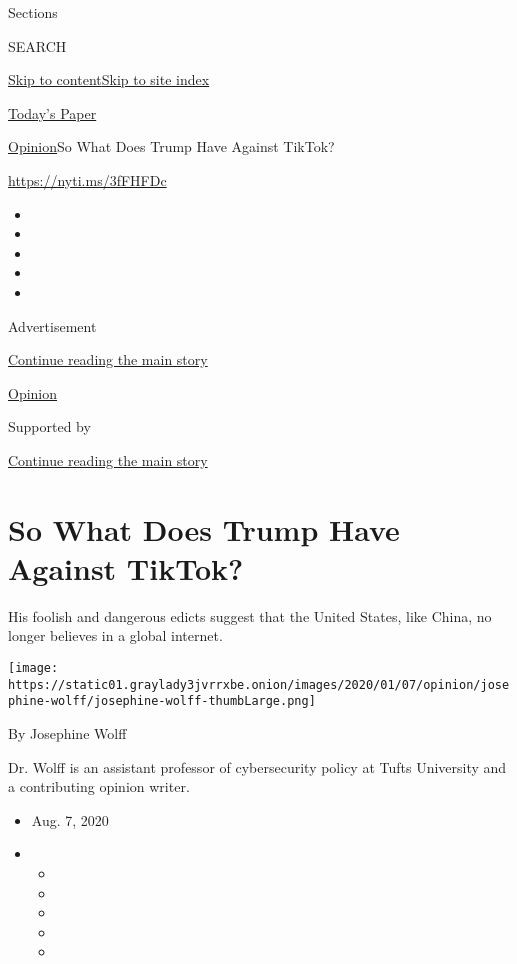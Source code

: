Sections

SEARCH

\protect\hyperlink{site-content}{Skip to
content}\protect\hyperlink{site-index}{Skip to site index}

\href{https://myaccount.nytimes3xbfgragh.onion/auth/login?response_type=cookie\&client_id=vi}{}

\href{https://www.nytimes3xbfgragh.onion/section/todayspaper}{Today's
Paper}

\href{/section/opinion}{Opinion}\textbar{}So What Does Trump Have
Against TikTok?

\url{https://nyti.ms/3fFHFDc}

\begin{itemize}
\item
\item
\item
\item
\item
\end{itemize}

Advertisement

\protect\hyperlink{after-top}{Continue reading the main story}

\href{/section/opinion}{Opinion}

Supported by

\protect\hyperlink{after-sponsor}{Continue reading the main story}

\hypertarget{so-what-does-trump-have-against-tiktok}{%
\section{So What Does Trump Have Against
TikTok?}\label{so-what-does-trump-have-against-tiktok}}

His foolish and dangerous edicts suggest that the United States, like
China, no longer believes in a global internet.

\texttt{[image: https://static01.graylady3jvrrxbe.onion/images/2020/01/07/opinion/josephine-wolff/josephine-wolff-thumbLarge.png]}

By Josephine Wolff

Dr. Wolff is an assistant professor of cybersecurity policy at Tufts
University and a contributing opinion writer.

\begin{itemize}
\item
  Aug. 7, 2020
\item
  \begin{itemize}
  \item
  \item
  \item
  \item
  \item
  \end{itemize}
\end{itemize}

